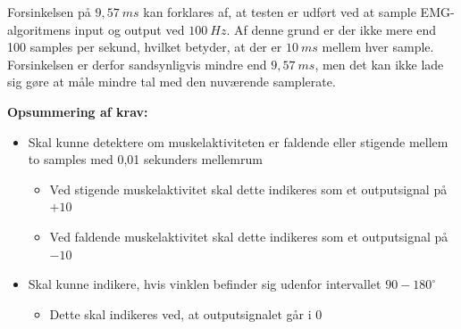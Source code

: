 Forsinkelsen på $9,57~ms$ kan forklares af, at testen er udført ved at sample EMG-algoritmens input og output ved $100~Hz$. Af denne grund er der ikke mere end 100 samples per sekund, hvilket betyder, at der er $10~ms$ mellem hver sample. Forsinkelsen er derfor sandsynligvis mindre end $9,57~ms$, men det kan ikke lade sig gøre at måle mindre tal med den nuværende samplerate. 

\vspace{3mm}
\textbf{Opsummering af krav:}
\begin{itemize}
\item[\text{\sffamily \checkmark}] Skal kunne detektere om muskelaktiviteten er faldende eller stigende mellem to samples med 0,01 sekunders mellemrum
\begin{itemize}
\item Ved stigende muskelaktivitet skal dette indikeres som et outputsignal på $+10$
\item Ved faldende muskelaktivitet skal dette indikeres som et outputsignal på $-10$
\end{itemize}
\item[\text{\sffamily \checkmark}] Skal kunne indikere, hvis vinklen befinder sig udenfor intervallet $90-180^{\circ}$
\begin{itemize}
\item Dette skal indikeres ved, at outputsignalet går i $0$
\end{itemize}
\end{itemize}